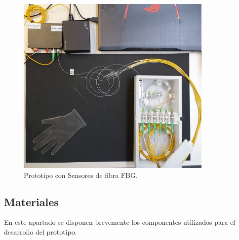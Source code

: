 	\begin{figure}[H]
		\centering
		\includegraphics[width=0.85\textwidth]{./img/prototipo}
		\caption{Prototipo con Sensores de fibra FBG.} \label{fig:prototipoFBG}
	\end{figure}


 
\subsection{Materiales}
\label{sec:materiales3}
En este apartado se disponen brevemente los componentes utilizados para el desarrollo del prototipo. 


